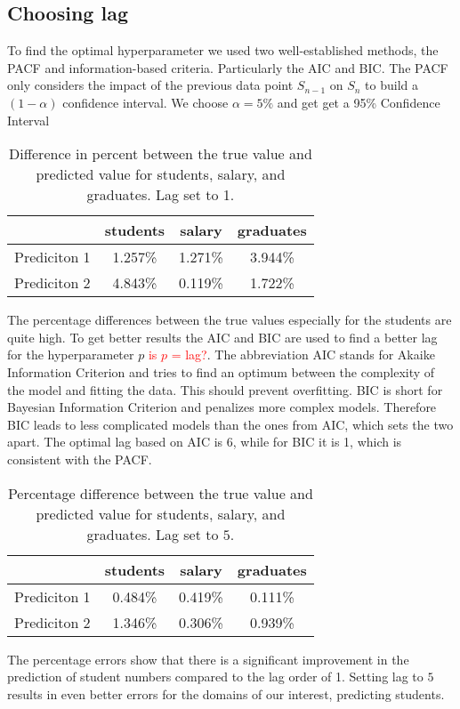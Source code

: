 \documentclass{article}
\theoremstyle{plain}
\theoremstyle{definition}
\theoremstyle{remark}
\begin{document}
\subsection{Choosing lag}\label{sec:methods:lag}
To find the optimal hyperparameter we used two well-established methods, the PACF and information-based criteria. Particularly the AIC and 
BIC. The PACF only considers the impact of the previous data point $S_{n-1}$ on $S_{n}$ to build a $(1-\alpha)$ confidence interval.
We choose $\alpha = 5\%$ and get get a 95\% Confidence Interval 
\begin{table}[H]
    \centering
    \begin{tabular}{c|c|c|c}
        & students & salary & graduates \\
        \hline
        Prediciton 1 & 1.257\% & 1.271\% & 3.944\% \\
        \hline
        Prediciton 2 & 4.843\% & 0.119\% & 1.722\%
    \end{tabular}
    \caption{Difference in percent between the true value and predicted value for students, salary, and graduates. Lag set to 1.}
\end{table}
The percentage differences between the true values especially for the students are quite high. To get better results
the AIC and BIC are used to find a better lag for the hyperparameter $p$ \textcolor{red}{is $p$ = lag?}. The abbreviation AIC
stands for Akaike Information Criterion and tries to find an optimum between the complexity of the model and fitting the data.
This should prevent overfitting. 
BIC is short for Bayesian Information Criterion and penalizes more complex models.
Therefore BIC leads to less complicated models than the ones from AIC, which sets the two apart.
The optimal lag based on AIC is 6, while for BIC it is 1, which is consistent with the PACF.
\begin{table}[H]
    \centering
    \begin{tabular}{c|c|c|c}
        & students & salary & graduates \\
        \hline
        Prediciton 1 & 0.484\% & 0.419\% & 0.111\% \\
        \hline
        Prediciton 2 & 1.346\% & 0.306\% & 0.939\%
    \end{tabular}
    \caption{Percentage difference between the true value and predicted value for students, salary, and graduates. Lag set to $5$.}
\end{table}

The percentage errors show that there is a significant improvement in the prediction of student numbers compared to the lag order of 1.
Setting lag to $5$ results in even better errors for the domains of our interest, predicting students.
\end{document}

